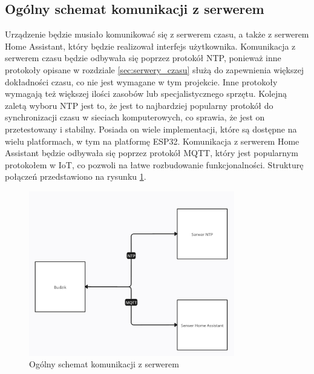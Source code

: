 \documentclass[../main.tex]{subfiles}
\begin{document}
\subsection{Ogólny schemat komunikacji z serwerem}
Urządzenie będzie musiało komunikować się z serwerem czasu, a także z serwerem Home Assistant, który będzie realizował interfejs użytkownika.
Komunikacja z serwerem czasu będzie odbywała się poprzez protokół NTP, ponieważ inne protokoły opisane w rozdziale \ref{sec:serwery_czasu}
służą do zapewnienia większej dokładności czasu, co nie jest wymagane w tym projekcie. Inne protokoły wymagają też większej ilości zasobów lub specjalistycznego sprzętu.
Kolejną zaletą wyboru NTP jest to, że jest to najbardziej popularny protokół do synchronizacji czasu w sieciach komputerowych, co sprawia, że jest on przetestowany i stabilny.
Posiada on wiele implementacji, które są dostępne na wielu platformach, w tym na platformę ESP32.
Komunikacja z serwerem Home Assistant będzie odbywała się poprzez protokół MQTT, który jest popularnym protokołem w IoT, co pozwoli na łatwe rozbudowanie funkcjonalności.
Strukturę połączeń przedstawiono na rysunku \ref{fig:communication}.
\begin{figure}[H]
    \centering
    \includegraphics[width=0.8\textwidth]{polaczenia.png}
    \caption{Ogólny schemat komunikacji z serwerem}
    \label{fig:communication}
\end{figure}
\end{document}
